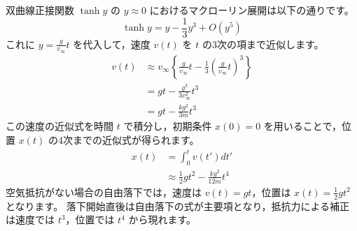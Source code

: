\begin{solutionparts}
双曲線正接関数 $\tanh y$ の $y \approx 0$ におけるマクローリン展開は以下の通りです。
\begin{equation*}
\tanh y = y - \frac{1}{3}y^3 + O(y^5)
\end{equation*}
これに $y = \frac{g}{v_{\infty}} t$ を代入して，速度 $v(t)$ を $t$ の3次の項まで近似します。
\begin{equation*}
\begin{aligned}
v(t) &\approx v_{\infty} \left\{ \frac{g}{v_{\infty}} t - \frac{1}{3} \left( \frac{g}{v_{\infty}} t \right)^3 \right\} \\
&= gt - \frac{g^3}{3 v_{\infty}^2} t^3 \\
&= gt - \frac{kg^2}{3m} t^3
\end{aligned}
\end{equation*}
この速度の近似式を時間 $t$ で積分し，初期条件 $x(0) = 0$ を用いることで，位置 $x(t)$ の4次までの近似式が得られます。
\begin{equation*}
\begin{aligned}
x(t) &= \int_{0}^{t} v(t') dt' \\
&\approx \frac{1}{2}gt^2 - \frac{kg^2}{12m} t^4
\end{aligned}
\end{equation*}
空気抵抗がない場合の自由落下では，速度は $v(t) = gt$，位置は $x(t) = \frac{1}{2}gt^2$ となります。 落下開始直後は自由落下の式が主要項となり，抵抗力による補正は速度では $t^3$，位置では $t^4$ から現れます。


\end{solutionparts}

